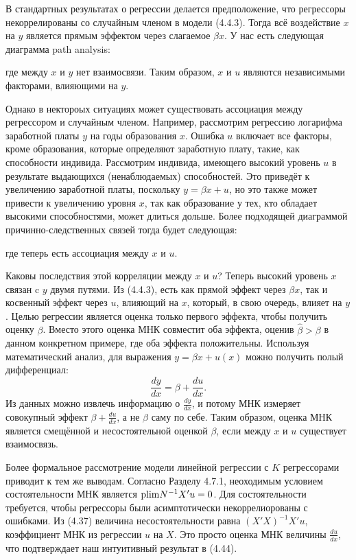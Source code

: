 В стандартных результатах о регрессии делается предположение, что регрессоры некоррелированы со случайным членом в модели (4.4.3). Тогда всё воздействие $x$ на $y$ является прямым эффектом через слагаемое  $\beta x$. У нас есть следующая диаграмма path analysis:
\begin{figure}
\end{figure}
где между $x$ и $y$ нет взаимосвязи. Таким образом, $x$ и $u$ являются независимыми факторами, влияющими на $y$.

Однако в нектороых ситуациях может существовать ассоциация между регрессором и случайным членом. Например,  рассмотрим регрессию логарифма заработной платы $y$ на годы образования $x$. Ошибка $u$ включает все факторы, кроме образования, которые определяют заработную плату, такие, как способности индивида. Рассмотрим индивида, имеющего высокий уровень $u$ в результате выдающихся (ненаблюдаемых) способностей. Это приведёт к увеличению заработной платы, поскольку $y = \beta x +u$, но это также может привести к увеличению уровня $x$, так как образование у тех, кто обладает высокими способностями, может длиться дольше. Более подходящей диаграммой причинно-следственных связей  тогда будет следующая:
\begin{figure}
\end{figure} 
где теперь есть ассоциация между $x$ и $u$.

Каковы последствия этой корреляции между  $x$ и $u$? Теперь высокий уровень $x$ связан c $y$ двумя путями. Из (4.4.3), есть как прямой эффект через $\beta x$, так и косвенный эффект через $u$, влияющий на $x$, который, в свою очередь, влияет на $y$. Целью регрессии является оценка только первого эффекта, чтобы получить оценку $\beta$. Вместо этого оценка МНК совместит оба эффекта, оценив $\hat{\beta}>\beta$ в данном конкретном примере, где оба эффекта положительны. Используя математический анализ, для выражения $y = \beta x +u(x)$ можно получить полый дифференциал:
\begin{equation}
\frac{dy}{dx} = \beta + \frac{du}{dx}.
\end{equation}
Из данных можно извлечь информацию о $\frac{dy}{dx}$, и потому МНК измеряет совокупный эффект $\beta + \frac{du}{dx}$, а не $\beta$ саму по себе. Таким образом, оценка МНК является смещённой и несостоятельной оценкой $\beta$, если между $x$ и $u$ существует взаимосвязь.

Более формальное рассмотрение модели линейной регрессии с $K$ регрессорами приводит к тем же выводам. Согласно Разделу 4.7.1, неоходимым условием состоятельности МНК является $\mathrm{plim } N^{-1}X'u=0$. Для состоятельности требуется, чтобы регрессоры были асимптотически некоррелиорованы с ошибками. Из (4.37) величина несостоятельности равна $(X'X)^{-1}X'u$, коэффициент МНК из регрессии $u$ на $X$. Это просто оценка МНК величины $\frac{du}{dx}$, что подтверждает наш интуитивный результат в (4.44).

